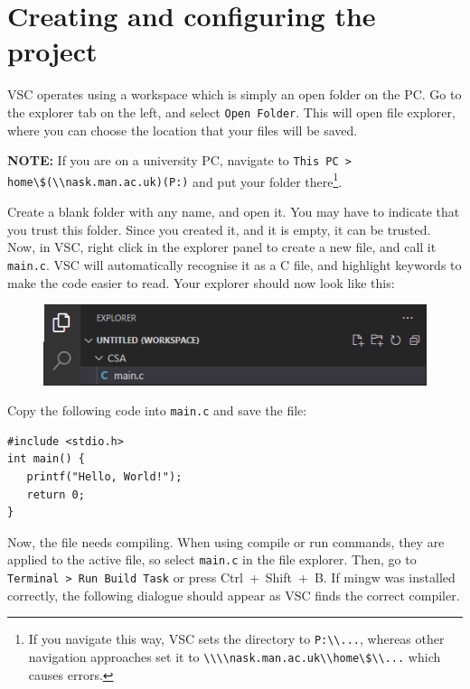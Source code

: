 \documentclass{article}
\newcommand{\code}[1]{\colorbox{codegrey}{\lstinline|#1|}}
\begin{document}
\section{Creating and configuring the project}\label{Section_3}

VSC operates using a workspace which is simply an open folder on the PC. Go to the explorer tab on the left, and select \code{Open Folder}. This will open file explorer, where you can choose the location that your files will be saved. 
\par
\textbf{NOTE: } If you are on a university PC, navigate to \code{This PC > home\$(\\nask.man.ac.uk)(P:)} and put your folder there\footnote{If you navigate this way, VSC sets the directory to \code{P:\\...}, whereas other navigation approaches set it to \code{\\\\nask.man.ac.uk\\home\$\\...} which causes errors.}. 
\par 
Create a blank folder with any name, and open it. You may have to indicate that you trust this folder. Since you created it, and it is empty, it can be trusted. Now, in VSC, right click in the explorer panel to create a new file, and call it \code{main.c}. VSC will automatically recognise it as a C file, and highlight keywords to make the code easier to read. Your explorer should now look like this:
\begin{figure}[H]
    \centering
    \includegraphics[width=0.8\linewidth]{explorer.png}
    \label{fig:enter-label}
\end{figure}

Copy the following code into \code{main.c} and save the file:

\begin{verbatim}
#include <stdio.h> 
int main() {
   printf("Hello, World!");
   return 0;
}
\end{verbatim}

Now, the file needs compiling. When using compile or run commands, they are applied to the active file, so select \code{main.c} in the file explorer. Then, go to \code{Terminal > Run Build Task} or press Ctrl~+~Shift~+~B. If mingw was installed correctly, the following dialogue should appear as VSC finds the correct compiler.
\end{document}
